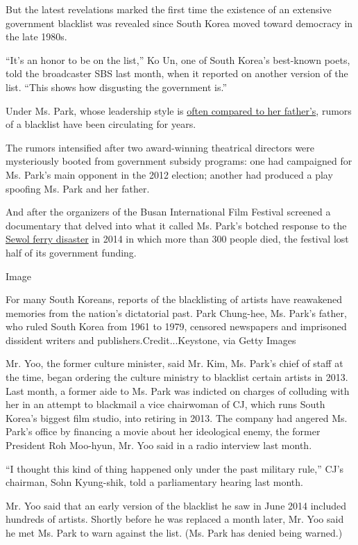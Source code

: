 But the latest revelations marked the first time the existence of an
extensive government blacklist was revealed since South Korea moved
toward democracy in the late 1980s.

``It's an honor to be on the list,'' Ko Un, one of South Korea's
best-known poets, told the broadcaster SBS last month, when it reported
on another version of the list. ``This shows how disgusting the
government is.''

Under Ms. Park, whose leadership style is
\href{http://www.nytimes.com/2016/11/12/world/asia/south-korea-park-geun-hye.html}{often
compared to her father's}, rumors of a blacklist have been circulating
for years.

The rumors intensified after two award-winning theatrical directors were
mysteriously booted from government subsidy programs: one had campaigned
for Ms. Park's main opponent in the 2012 election; another had produced
a play spoofing Ms. Park and her father.

And after the organizers of the Busan International Film Festival
screened a documentary that delved into what it called Ms. Park's
botched response to the
\href{https://www.nytimes.com/2014/04/30/world/asia/south-korea-ferry-disaster.html}{Sewol
ferry disaster} in 2014 in which more than 300 people died, the festival
lost half of its government funding.

Image

For many South Koreans, reports of the blacklisting of artists have
reawakened memories from the nation's dictatorial past. Park Chung-hee,
Ms. Park's father, who ruled South Korea from 1961 to 1979, censored
newspapers and imprisoned dissident writers and
publishers.Credit...Keystone, via Getty Images

Mr. Yoo, the former culture minister, said Mr. Kim, Ms. Park's chief of
staff at the time, began ordering the culture ministry to blacklist
certain artists in 2013. Last month, a former aide to Ms. Park was
indicted on charges of colluding with her in an attempt to blackmail a
vice chairwoman of CJ, which runs South Korea's biggest film studio,
into retiring in 2013. The company had angered Ms. Park's office by
financing a movie about her ideological enemy, the former President Roh
Moo-hyun, Mr. Yoo said in a radio interview last month.

``I thought this kind of thing happened only under the past military
rule,'' CJ's chairman, Sohn Kyung-shik, told a parliamentary hearing
last month.

Mr. Yoo said that an early version of the blacklist he saw in June 2014
included hundreds of artists. Shortly before he was replaced a month
later, Mr. Yoo said he met Ms. Park to warn against the list. (Ms. Park
has denied being warned.)

